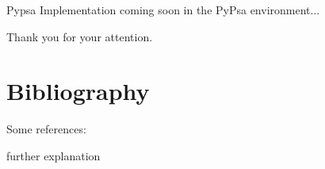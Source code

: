 \documentclass[11pt, aspectratio=169]{beamer}
\begin{document}
\begin{frame}{Pypsa}
  Implementation coming soon in the PyPsa environment...

  \vspace{1cm}

  Thank you for your attention.
\end{frame} 
\section{Bibliography}
\begin{frame}{}
Some references:\\[2em]
\begin{footnotesize}
\printbibliography[
title={Bibliography}]
\end{footnotesize}
\end{frame}

\begin{frame}[noframenumbering]{}
  further explanation
\end{frame}
\end{document}
